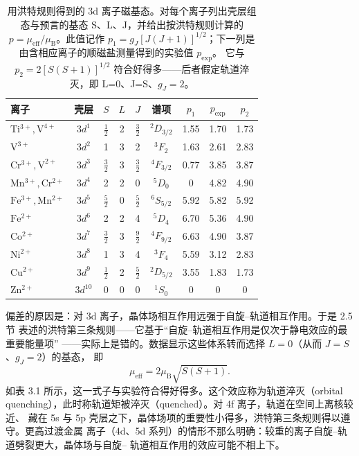 \begin{table}
\centering
\caption{用洪特规则得到的 3d 离子磁基态。对每个离子列出壳层组态与预言的基态
S、L、J，并给出按洪特规则计算的 $p=\mu_{\mathrm{eff}}/\mu_{\mathrm{B}}$。此值记作
$p_1=g_J[J(J+1)]^{1/2}$；下一列是由含相应离子的顺磁盐测量得到的实验值 $p_{\mathrm{exp}}$。
它与 $p_2=2[S(S+1)]^{1/2}$ 符合好得多——后者假定轨道淬灭，即 L=0、J=S、$g_J=2$。}
\small
\begin{tabular}{lcccccccc}
\toprule
离子 & 壳层 & $S$ & $L$ & $J$ & 谱项 & $p_1$ & $p_{\mathrm{exp}}$ & $p_2$\\
\midrule
$\mathrm{Ti^{3+}},\mathrm{V^{4+}}$ & $3d^{1}$ & $\frac{1}{2}$ & 2 & $\frac{3}{2}$ & ${}^{2}D_{3/2}$ & 1.55 & 1.70 & 1.73\\
$\mathrm{V^{3+}}$ & $3d^{2}$ & 1 & 3 & 2 & ${}^{3}F_{2}$ & 1.63 & 2.61 & 2.83\\
$\mathrm{Cr^{3+}},\mathrm{V^{2+}}$ & $3d^{3}$ & $\frac{3}{2}$ & 3 & $\frac{3}{2}$ & ${}^{4}F_{3/2}$ & 0.77 & 3.85 & 3.87\\
$\mathrm{Mn^{3+}},\mathrm{Cr^{2+}}$ & $3d^{4}$ & 2 & 2 & 0 & ${}^{5}D_{0}$ & 0 & 4.82 & 4.90\\
$\mathrm{Fe^{3+}},\mathrm{Mn^{2+}}$ & $3d^{5}$ & $\frac{5}{2}$ & 0 & $\frac{5}{2}$ & ${}^{6}S_{5/2}$ & 5.92 & 5.82 & 5.92\\
$\mathrm{Fe^{2+}}$ & $3d^{6}$ & 2 & 2 & 4 & ${}^{5}D_{4}$ & 6.70 & 5.36 & 4.90\\
$\mathrm{Co^{2+}}$ & $3d^{7}$ & $\frac{3}{2}$ & 3 & $\frac{9}{2}$ & ${}^{4}F_{9/2}$ & 6.63 & 4.90 & 3.87\\
$\mathrm{Ni^{2+}}$ & $3d^{8}$ & 1 & 3 & 4 & ${}^{3}F_{4}$ & 5.59 & 3.12 & 2.83\\
$\mathrm{Cu^{2+}}$ & $3d^{9}$ & $\frac{1}{2}$ & 2 & $\frac{5}{2}$ & ${}^{2}D_{5/2}$ & 3.55 & 1.83 & 1.73\\
$\mathrm{Zn^{2+}}$ & $3d^{10}$ & 0 & 0 & 0 & ${}^{1}S_{0}$ & 0 & 0 & 0\\
\bottomrule
\end{tabular}
\end{table}

偏差的原因是：对 3d 离子，晶体场相互作用远强于自旋--轨道相互作用。于是 2.5 节
表述的洪特第三条规则——它基于“自旋--轨道相互作用是仅次于静电效应的最重要能量项”
——实际上是错的。数据显示这些体系转而选择 $L=0$（从而 $J=S$、$g_J=2$）的基态，
即
\begin{equation*}
\mu_{\mathrm{eff}} = 2\mu_{\mathrm{B}}\sqrt{S(S+1)}.\tag{3.1}
\end{equation*}
如表 3.1 所示，这一式子与实验符合得好得多。这个效应称为轨道淬灭（orbital
quenching），此时称轨道矩被淬灭（quenched）。对 4f 离子，轨道在空间上离核较近、
藏在 5s 与 5p 壳层之下，晶体场项的重要性小得多，洪特第三条规则得以遵守。更高过渡金属
离子（4d、5d 系列）的情形不那么明确：较重的离子自旋--轨道劈裂更大，晶体场与自旋--
轨道相互作用的效应可能不相上下。

